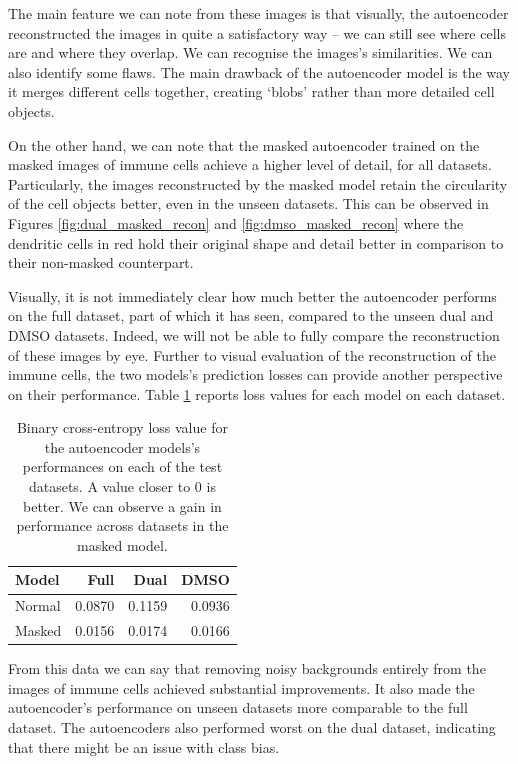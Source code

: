 The main feature we can note from these images is that visually, the autoencoder reconstructed the images in quite a satisfactory way – we can still see where cells are and where they overlap. We can recognise the images's similarities. We can also identify some flaws. The main drawback of the autoencoder model is the way it merges different cells together, creating `blobs' rather than more detailed cell objects.

On the other hand, we can note that the masked autoencoder trained on the masked images of immune cells achieve a higher level of detail, for all datasets. Particularly, the images reconstructed by the masked model retain the circularity of the cell objects better, even in the unseen datasets. This can be observed in Figures \ref{fig:dual_masked_recon} and \ref{fig:dmso_masked_recon} where the dendritic cells in red hold their original shape and detail better in comparison to their non-masked counterpart.

Visually, it is not immediately clear how much better the autoencoder performs on the full dataset, part of which it has seen, compared to the unseen dual and DMSO datasets. Indeed, we will not be able to fully compare the reconstruction of these images by eye. Further to visual evaluation of the reconstruction of the immune cells, the two models's prediction losses can provide another perspective on their performance. Table \ref{tab:autoencoder_loss} reports loss values for each model on each dataset.

\begin{table}[!h]
\centering
\caption{Binary cross-entropy loss value for the autoencoder models's performances on each of the test datasets. A value closer to 0 is better. We can observe a gain in performance across datasets in the masked model.}
\label{tab:autoencoder_loss}
\begin{tabular}{l|r|r|r}
\rowcolor[HTML]{EFEFEF}
Model  & Full   & Dual   & DMSO   \\ \hline
Normal & 0.0870 & 0.1159 & 0.0936 \\ \hline
Masked & 0.0156 & 0.0174 & 0.0166 \\
\end{tabular}
\end{table}

From this data we can say that removing noisy backgrounds entirely from the images of immune cells achieved substantial improvements. It also made the autoencoder's performance on unseen datasets more comparable to the full dataset. The autoencoders also performed worst on the dual dataset, indicating that there might be an issue with class bias.

